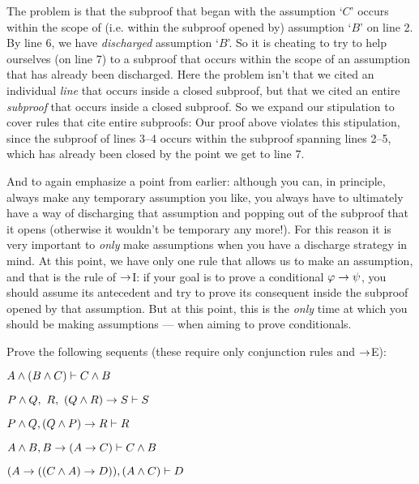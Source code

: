 The problem is that the subproof that began with the assumption `$C$' occurs within the scope of (i.e. within the subproof opened by) assumption `$B$' on line 2. By line 6, we have \emph{discharged} assumption `$B$'. So it is cheating to try to help ourselves (on line 7) to a subproof that occurs within the scope of an assumption that has already been discharged.  Here the problem isn't that we cited an individual \emph{line} that occurs inside a closed subproof, but that we cited an entire \emph{subproof} that occurs inside a closed subproof.  So we expand our stipulation to cover rules that cite entire subproofs:
Our proof above violates this stipulation, since the subproof of lines 3--4 occurs within the subproof spanning lines 2--5, which has already been closed by the point we get to line 7.


And to again emphasize a point from earlier: although you can, in principle, always make any temporary assumption you like, you always have to ultimately have a way of discharging that assumption and popping out of the subproof that it opens (otherwise it wouldn't be temporary any more!).    For this reason it is very important to \emph{only}  make assumptions when you have a discharge strategy in mind.  At this point, we have only one rule that allows us to make an assumption, and that is the rule of $\rightarrow$I: if your goal is to prove a conditional $\mathcal{\varphi} \rightarrow \mathcal{\psi}$, you should assume its antecedent \meta{\varphi} and try to prove its consequent \meta{\psi} inside the subproof opened by that assumption.  But at this point, this is the \emph{only} time at which you should be making assumptions --- when aiming to prove conditionals.

\practiceproblems
\problempart
Prove the following sequents (these require only conjunction rules and $\rightarrow$E):

\begin{earg}
\item $A \wedge (B \wedge C) \vdash C \wedge B$
\item $P \wedge  Q, \ R, \ (Q \wedge  R) \rightarrow S \vdash S$
\item $P \wedge Q, (Q \wedge P) \rightarrow R \vdash R$
\item $A \wedge B, B \rightarrow (A \rightarrow C) \vdash C \wedge B$
 \item $(A\rightarrow ((C\wedge  A)\rightarrow D)), (A\wedge  C) \vdash D$
\end{earg}

